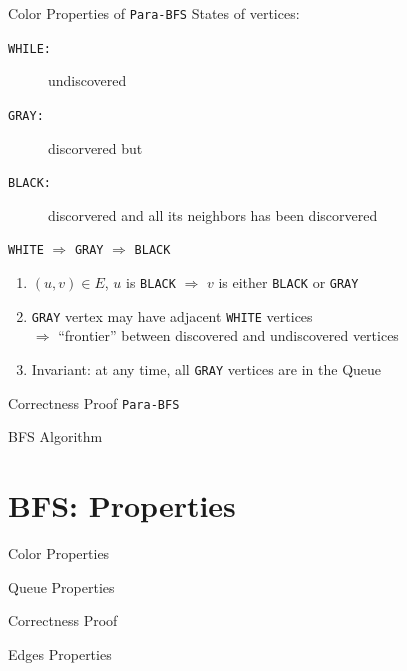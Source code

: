 \documentclass{beamer}
\begin{document}
\begin{frame}{Color Properties of \texttt{Para-BFS}}
  States of vertices:
  \begin{description}
    \item [\texttt{WHILE:}] undiscovered
    \item [\texttt{GRAY:}]	discorvered but
    \item [\texttt{BLACK:}]	discorvered and all its neighbors has been
    discorvered
  \end{description}

  \begin{center}
  	\texttt{WHITE} $\Rightarrow$ \texttt{GRAY} $\Rightarrow$ \texttt{BLACK}
  \end{center}

  \begin{enumerate}
    \item $(u,v) \in E$, $u$ is \texttt{BLACK} $\Rightarrow$ $v$ is either
    \texttt{BLACK} or \texttt{GRAY}
    \item \texttt{GRAY} vertex may have adjacent \texttt{WHITE} vertices
    \\ $\Rightarrow$ ``frontier'' between discovered and undiscovered vertices
    \item Invariant: at any time, all \texttt{GRAY} vertices are in the Queue
  \end{enumerate}
\end{frame}
\begin{frame}{Correctness Proof \texttt{Para-BFS}}

\end{frame}
\begin{frame}{BFS Algorithm}

\end{frame}
\section{BFS: Properties}

\begin{frame}{Color Properties}

\end{frame}
\begin{frame}{Queue Properties}

\end{frame}
\begin{frame}{Correctness Proof}

\end{frame}
\begin{frame}{Edges Properties}

\end{frame}
\end{document}
